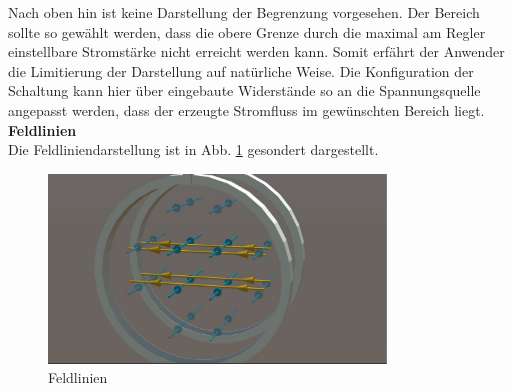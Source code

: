 Nach oben hin ist keine Darstellung der Begrenzung vorgesehen. Der Bereich sollte so gewählt werden, dass die obere Grenze durch die maximal am Regler einstellbare Stromstärke nicht erreicht werden kann. Somit erfährt der Anwender die Limitierung der Darstellung auf natürliche Weise. Die Konfiguration der Schaltung kann hier über eingebaute Widerstände so an die Spannungsquelle angepasst werden, dass der erzeugte Stromfluss im gewünschten Bereich liegt.\\

\textbf{Feldlinien}\\
Die Feldliniendarstellung ist in Abb. \ref{img:mfield-lines} gesondert dargestellt.
\begin{figure}[H]
	\centering
	\includegraphics[width=0.8\textwidth]{images/fieldlines.jpg}
	\caption{Feldlinien}
	\label{img:mfield-lines}
\end{figure}
\vspace{4px}
\begin{center}
	\\
\end{center}
